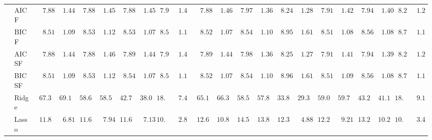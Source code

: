 \documentclass{article}
\begin{document}
\begin{tabular}{ll|ll|llllll|llllll|llllll}
 & AIC F  & $\phantom{00}7.88$ & $\phantom{00}1.44$ & $\phantom{00}7.88$ & $\phantom{00}1.45$ & $\phantom{00}7.88$ & $\phantom{00}1.45$ & $\phantom{0}7.90$ & $\phantom{0}1.43$ & $\phantom{00}7.88$ & $\phantom{00}1.46$ & $\phantom{00}7.97$ & $\phantom{00}1.36$ & $\phantom{00}8.24$ & $\phantom{00}1.28$ & $\phantom{00}7.91$ & $\phantom{00}1.42$ & $\phantom{00}7.94$ & $\phantom{00}1.40$ & $\phantom{0}8.21$ & $\phantom{0}1.23$ \\
 & BIC F  & $\phantom{00}8.51$ & $\phantom{00}1.09$ & $\phantom{00}8.53$ & $\phantom{00}1.12$ & $\phantom{00}8.53$ & $\phantom{00}1.07$ & $\phantom{0}8.59$ & $\phantom{0}1.13$ & $\phantom{00}8.52$ & $\phantom{00}1.07$ & $\phantom{00}8.54$ & $\phantom{00}1.10$ & $\phantom{00}8.95$ & $\phantom{00}1.61$ & $\phantom{00}8.51$ & $\phantom{00}1.08$ & $\phantom{00}8.56$ & $\phantom{00}1.08$ & $\phantom{0}8.70$ & $\phantom{0}1.16$ \\
 & AIC SF  & $\phantom{00}7.88$ & $\phantom{00}1.44$ & $\phantom{00}7.88$ & $\phantom{00}1.46$ & $\phantom{00}7.89$ & $\phantom{00}1.44$ & $\phantom{0}7.90$ & $\phantom{0}1.43$ & $\phantom{00}7.89$ & $\phantom{00}1.44$ & $\phantom{00}7.98$ & $\phantom{00}1.36$ & $\phantom{00}8.25$ & $\phantom{00}1.27$ & $\phantom{00}7.91$ & $\phantom{00}1.41$ & $\phantom{00}7.94$ & $\phantom{00}1.39$ & $\phantom{0}8.21$ & $\phantom{0}1.23$ \\
 & BIC SF  & $\phantom{00}8.51$ & $\phantom{00}1.09$ & $\phantom{00}8.53$ & $\phantom{00}1.12$ & $\phantom{00}8.54$ & $\phantom{00}1.07$ & $\phantom{0}8.59$ & $\phantom{0}1.13$ & $\phantom{00}8.52$ & $\phantom{00}1.07$ & $\phantom{00}8.54$ & $\phantom{00}1.10$ & $\phantom{00}8.96$ & $\phantom{00}1.61$ & $\phantom{00}8.51$ & $\phantom{00}1.09$ & $\phantom{00}8.56$ & $\phantom{00}1.08$ & $\phantom{0}8.70$ & $\phantom{0}1.16$ \\
 & Ridge  & $\phantom{0}67.36$ & $\phantom{0}69.16$ & $\phantom{0}58.68$ & $\phantom{0}58.50$ & $\phantom{0}42.73$ & $\phantom{0}38.02$ & $18.74$ & $\phantom{0}7.40$ & $\phantom{0}65.19$ & $\phantom{0}66.39$ & $\phantom{0}58.54$ & $\phantom{0}57.87$ & $\phantom{0}33.80$ & $\phantom{0}29.35$ & $\phantom{0}59.09$ & $\phantom{0}59.74$ & $\phantom{0}43.24$ & $\phantom{0}41.13$ & $18.73$ & $\phantom{0}9.17$ \\
 & Lasso  & $\phantom{0}11.83$ & $\phantom{00}6.81$ & $\phantom{0}11.65$ & $\phantom{00}7.94$ & $\phantom{0}11.63$ & $\phantom{00}7.13$ & $10.63$ & $\phantom{0}2.82$ & $\phantom{0}12.64$ & $\phantom{0}10.88$ & $\phantom{0}14.55$ & $\phantom{0}13.80$ & $\phantom{0}12.38$ & $\phantom{00}4.88$ & $\phantom{0}12.25$ & $\phantom{00}9.21$ & $\phantom{0}13.24$ & $\phantom{0}10.21$ & $10.95$ & $\phantom{0}3.45$ \\

\end{tabular}
\end{document}
